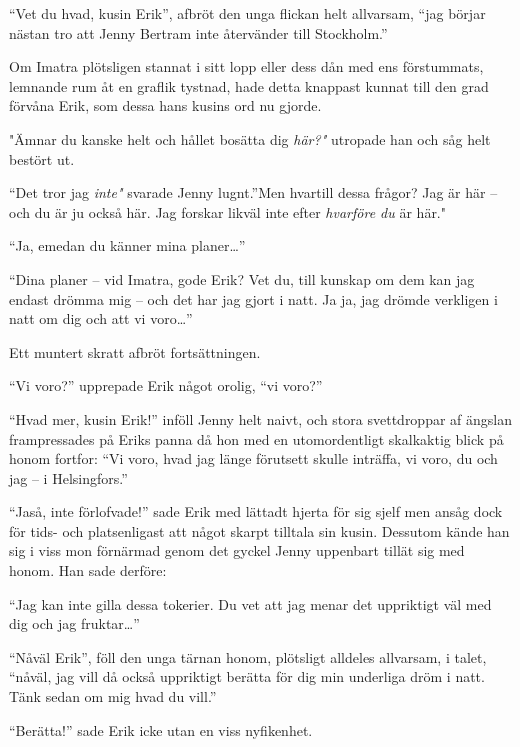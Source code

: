 ``Vet du hvad, kusin Erik'', afbröt den unga flickan helt allvarsam,
``jag börjar nästan tro att Jenny Bertram inte återvänder till
Stockholm.''

Om Imatra plötsligen stannat i sitt lopp eller dess dån med ens
förstummats, lemnande rum åt en graflik tystnad, hade detta knappast
kunnat till den grad förvåna Erik, som dessa hans kusins ord nu gjorde.

"Ämnar du kanske helt och hållet bosätta dig \emph{här?"} utropade han
och såg helt bestört ut.

``Det tror jag \emph{inte"} svarade Jenny lugnt.''Men hvartill dessa
frågor? Jag är här -- och du är ju också här. Jag forskar likväl inte
efter \emph{hvarföre du} är här."

``Ja, emedan du känner mina planer\ldots{}''

``Dina planer -- vid Imatra, gode Erik? Vet du, till kunskap om dem kan
jag endast drömma mig -- och det har jag gjort i natt. Ja ja, jag drömde
verkligen i natt om dig och att vi voro\ldots{}''

Ett muntert skratt afbröt fortsättningen.

``Vi voro?'' upprepade Erik något orolig, ``vi voro?''

``Hvad mer, kusin Erik!'' inföll Jenny helt naivt, och stora
svettdroppar af ängslan frampressades på Eriks panna då hon med en
utomordentligt skalkaktig blick på honom fortfor: ``Vi voro, hvad jag
länge förutsett skulle inträffa, vi voro, du och jag -- i Helsingfors.''

``Jaså, inte förlofvade!'' sade Erik med lättadt hjerta för sig sjelf
men ansåg dock för tids- och platsenligast att något skarpt tilltala sin
kusin. Dessutom kände han sig i viss mon förnärmad genom det gyckel
Jenny uppenbart tillät sig med honom. Han sade derföre:

``Jag kan inte gilla dessa tokerier. Du vet att jag menar det uppriktigt
väl med dig och jag fruktar\ldots{}''

``Nåväl Erik'', föll den unga tärnan honom, plötsligt alldeles
allvarsam, i talet, ``nåväl, jag vill då också uppriktigt berätta för
dig min underliga dröm i natt. Tänk sedan om mig hvad du vill.''

``Berätta!'' sade Erik icke utan en viss nyfikenhet.

